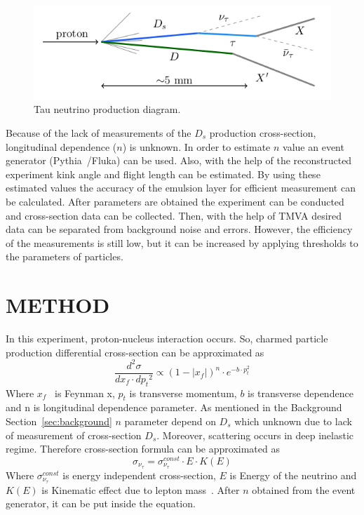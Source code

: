 \documentclass[12pt, letterpaper]{article}
\begin{document}
\begin{figure}[htpb]
\includegraphics[width=\linewidth]{dstauProcess.png}
\caption{Tau neutrino production diagram.}
\label{fig:process}
\end{figure}

Because of the lack of measurements of the $D_s$ production cross-section, longitudinal dependence ($n$) is unknown. In order to estimate $n$ value an event generator (Pythia~\cite{sjostrand_mrenna_skands_2007}/Fluka) can be used. Also, with the help of the reconstructed experiment kink angle and flight length can be estimated. By using these estimated values the accuracy of the emulsion layer for efficient measurement can be calculated. After parameters are obtained the experiment can be conducted and cross-section data can be collected. Then, with the help of TMVA desired data can be separated from background noise and errors. However, the efficiency of the measurements is still low, but it can be increased by applying thresholds to the parameters of particles.

\section{METHOD}

In this experiment, proton-nucleus interaction occurs. So, charmed particle production differential cross-section can be approximated as 
\begin{equation}
\frac{d^2{\sigma}}{d{x_f}\cdot d{p_t}^2} \propto (1-|x_f|)^n \cdot e^{-b\cdot p_t^2}
\end{equation}
Where $x_f$~\cite{olsson_2014} is Feynman x, $p_t$ is transverse momentum, $b$ is transverse dependence and n is longitudinal dependence parameter. As mentioned in the Background Section~\ref{sec:background} $n$ parameter depend on $D_s$ which unknown due to lack of measurement of cross-section $D_s$. Moreover, scattering occurs in deep inelastic regime. Therefore cross-section formula can be approximated as
\begin{equation}
\sigma_{\nu_\tau} = \sigma^{const}_{\nu_\tau} \cdot E \cdot K(E)
\end{equation}
Where $\sigma^{const}_{\nu_\tau}$ is energy independent cross-section, $E$ is Energy of the neutrino and $K(E)$ is Kinematic effect due to lepton mass~\cite{kodama_ushida_andreopoulos_saoulidou_tzanakos_yager_baller_boehnlein_freeman_lundberg_2016}.
After $n$ obtained from the event generator, it can be put inside the equation.
\end{document}
